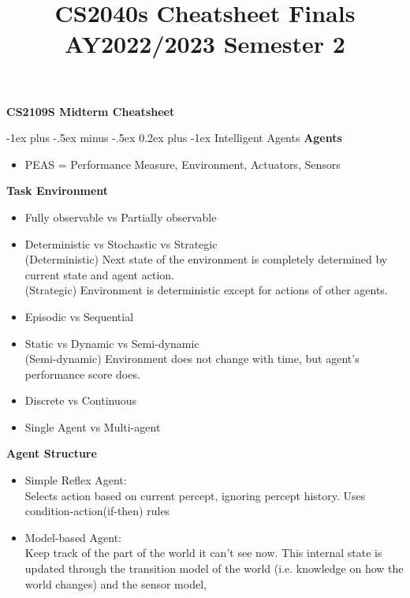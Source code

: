 \documentclass[10pt,landscape]{article}
\title{CS2040s Cheatsheet Finals AY2022/2023 Semester 2}
\makeatletter
\renewcommand{\subsubsection}{\@startsection{subsubsection}{3}{0mm}%
                                {-1ex plus -.5ex minus -.5ex}%
                                {0.2ex plus -1ex}%
                                {\normalfont\footnotesize\bfseries}}
\makeatother
\begin{document}
\raggedright
\footnotesize

\begin{center}
     \Large{\textbf{CS2109S Midterm Cheatsheet}} \\
\end{center}
\begin{multicols}{3}
\setlength{\premulticols}{1pt}
\setlength{\postmulticols}{1pt}
\setlength{\multicolsep}{1pt}
\setlength{\columnsep}{2pt}
\begin{scriptsize}

\subsubsection{Intelligent Agents}
\textbf{Agents} 
\begin{itemize}
  \item PEAS = Performance Measure, Environment, Actuators, Sensors
\end{itemize}
\textbf{Task Environment} 
\begin{itemize}
  \item Fully observable vs Partially observable
  \item Deterministic vs Stochastic vs Strategic 
  \\(Deterministic) Next state of the environment is completely determined by current state and agent action.
  \\(Strategic) Environment is deterministic except for actions of other agents.
  \item Episodic vs Sequential
  \item Static vs Dynamic vs Semi-dynamic
  \\(Semi-dynamic) Environment does not change with time, but agent's performance score does.
  \item Discrete vs Continuous
  \item Single Agent vs Multi-agent
\end{itemize}
\textbf{Agent Structure} 
\begin{itemize}
  \item Simple Reflex Agent:\\Selects action based on current percept, 
  ignoring percept history. Uses condition-action(if-then) rules
  \item Model-based Agent:\\Keep track of the part of
  the world it can’t see now. This internal state is updated
  through the transition model of the world (i.e. knowledge on how the world changes) and the sensor model,

\end{itemize}
\end{scriptsize}
\end{multicols}
\end{document}

